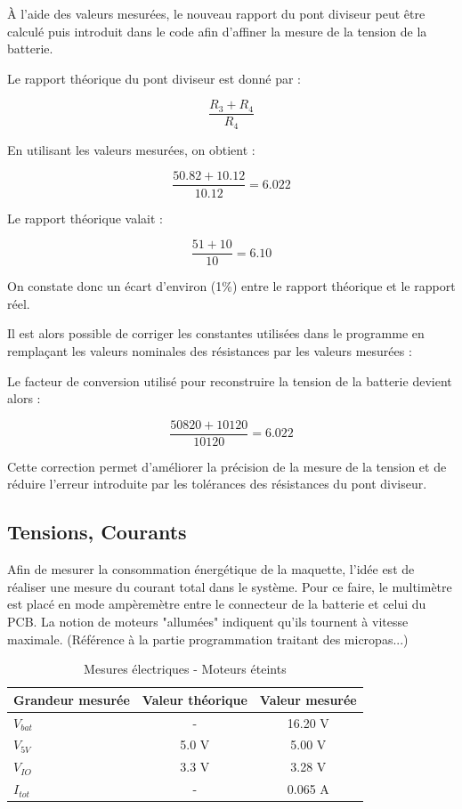  À l'aide des valeurs mesurées, le nouveau rapport du pont diviseur peut être calculé puis introduit dans le code afin d'affiner la mesure de la tension de la batterie.

Le rapport théorique du pont diviseur est donné par :

$$
\frac{R_3+R_4}{R_4}
$$

En utilisant les valeurs mesurées, on obtient :

$$
\frac{50.82 + 10.12}{10.12}=6.022
$$

Le rapport théorique valait :

$$
\frac{51+10}{10}=6.10
$$

On constate donc un écart d'environ (1\%) entre le rapport théorique et le rapport réel.

Il est alors possible de corriger les constantes utilisées dans le programme en remplaçant les valeurs nominales des résistances par les valeurs mesurées :


Le facteur de conversion utilisé pour reconstruire la tension de la batterie devient alors :

$$
\frac{50820+10120}{10120}=6.022
$$

Cette correction permet d'améliorer la précision de la mesure de la tension et de réduire l'erreur introduite par les tolérances des résistances du pont diviseur.

\subsection{Tensions, Courants}
Afin de mesurer la consommation énergétique de la maquette, l'idée est de réaliser une mesure du courant total dans le système.
Pour ce faire, le multimètre est placé en mode ampèremètre entre le connecteur de la batterie et celui du PCB.
La notion de moteurs "allumées" indiquent qu'ils tournent à vitesse maximale. (Référence à la partie programmation traitant des micropas...)

\begin{table}[H]
    \centering
    \begin{tabular}{|l|c|c|}
        \hline
        \textbf{Grandeur mesurée} & \textbf{Valeur théorique} & \textbf{Valeur mesurée} \\
        \hline
        $V_{bat}$ & - & 16.20 V \\
        \hline
        $V_{5V}$ & 5.0 V & 5.00 V \\
        \hline
        $V_{IO}$ & 3.3 V & 3.28 V \\
        \hline
        $I_{tot}$ & - & 0.065 A \\
        \hline
    \end{tabular}
    \caption{Mesures électriques - Moteurs éteints}
    \label{tab:moteurs_eteints}
\end{table}


